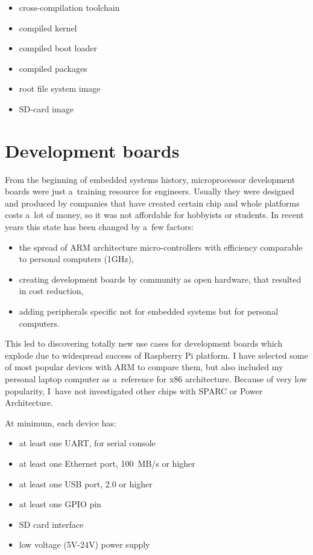 \documentclass[printmode]{mgr}
\begin{document}
\begin{itemize}
    \item cross-compilation toolchain
    \item compiled kernel
    \item compiled boot loader
    \item compiled packages
    \item root file system image
    \item SD-card image
\end{itemize}



















\chapter{Development boards}
\label{section:development-boards}

From the beginning of embedded systems history, microprocessor development boards were just a~training resource for engineers.
Usually they were designed and produced by companies that have created certain chip and whole platforms costs a~lot of money, so it was not affordable for hobbyists or students.
In recent years this state has been changed by a~few factors:
\begin{itemize}
  \item the spread of ARM architecture micro-controllers with efficiency comparable to personal computers (1GHz),
  \item creating development boards by community as open hardware, that resulted in cost reduction,
  \item adding peripherals specific not for embedded systems but for personal computers.
\end{itemize}
This led to discovering totally new use cases for development boards which explode due to widespread success of Raspberry Pi platform.
I have selected some of most popular devices with ARM to compare them, but also included my personal laptop computer as a~reference for x86 architecture. Because of very low popularity, I~have not investigated other chips with SPARC or Power Architecture.

At minimum, each device has:
\begin{itemize}
  \item at least one UART, for serial console
  \item at least one Ethernet port, 100~MB/s or higher
  \item at least one USB port, 2.0 or higher
  \item at least one GPIO pin
  \item SD card interface
  \item low voltage (5V-24V) power supply
\end{itemize}
\end{document}
